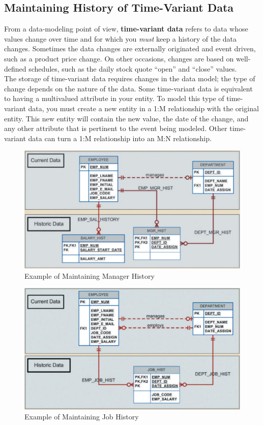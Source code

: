 \documentclass[a4paper, 12pt, titlepage]{report}
\begin{document}
{\subsection{Maintaining History of Time-Variant Data}
From a data-modeling point of view, \textbf{time-variant data} refers to data whose values change over time and for which you \emph{must} keep a history of the data changes. Sometimes the data changes are externally originated and event driven, such as a product price change. On other occasions, changes are based on well-defined schedules, such as the daily stock quote “open” and “close” values.\\
The storage of time-variant data requires changes in the data model; the type of change depends on the nature of the data. Some time-variant data is equivalent to having a multivalued attribute in your entity. To model this type of time-variant data, you must create a new entity in a 1:M relationship with the original entity. This new entity will contain the new value, the date of the change, and any other attribute that is pertinent to the event being modeled. Other time-variant data can turn a 1:M relationship into an M:N relationship.
\begin{figure}[H]
\centering
\includegraphics[scale=0.5]{Time1}
\caption{Example of Maintaining Manager History}
\end{figure}
\begin{figure}[H]
\centering
\includegraphics[scale=0.5]{Time2}
\caption{Example of Maintaining Job History}
\end{figure}
}
\end{document}
